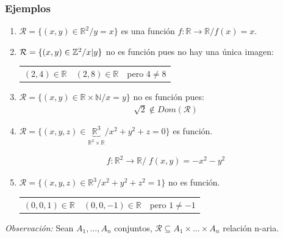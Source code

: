 \subsubsection{Ejemplos}
\begin{enumerate}
    \item $\mathcal{R} = \{(x,y) \in \mathbb{R}^2 / y = x\}$ es una función 
        $f: \mathbb{R} \to \mathbb{R} / f(x) = x$. 

    \item $\mathcal{R} = \{ (x,y) \in \mathbb{Z}^2 / \divides{x}{y} \}$ no es
        función pues no hay una única imagen:

        \begin{center}
          \begin{tabular}{c c c}
              $(2,4) \in \mathbb{R}$ & $(2,8) \in \mathbb{R}$ & pero $4 \neq 8$
          \end{tabular}
        \end{center}
    \item $\mathcal{R} = \{ (x,y) \in \mathbb{R} \times \mathbb{N} / x = y\}$
        no es función pues: 
        \begin{gather*}
            \sqrt{2} \notin Dom(\mathcal{R})
        \end{gather*}

    \item $\mathcal{R} = \{(x,y,z) \in 
        \underbrace{\mathbb{R}^3}_{\mathbb{R}^2 \times \mathbb{R}} / 
        x^2 + y^2 + z = 0\}$ es función.
        
        \begin{gather*}
            f: \mathbb{R}^2 \to \mathbb{R} / \; f(x,y) = -x^2 - y^2
        \end{gather*}

    \item $\mathcal{R} = \{ (x,y,z) \in \mathbb{R}^3 / x^2 + y^2 + z^2 = 1 \}$
        no es función.

        \begin{center}
            \begin{tabular}{c c c}
                $(0,0,1) \in \mathbb{R}$ & $(0,0,-1) \in \mathbb{R}$ & 
                pero $1 \neq -1$
            \end{tabular}
        \end{center}
\end{enumerate}

\bigskip
\textit{Observación:} 
Sean $A_1, \dotsc, A_n$ conjuntos, 
$\mathcal{R} \subseteq A_1 \times \dots \times A_n$ relación n-aria.

